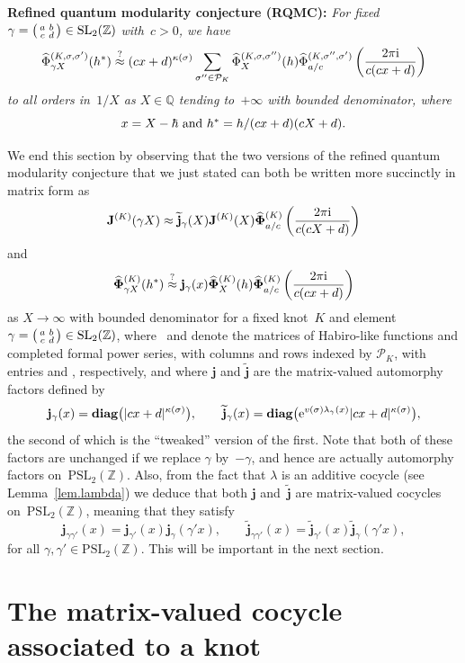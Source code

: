 \documentclass[pdftex]{sigma}
\numberwithin{equation}{section}
\def\BZ{\mathbb Z}
\def\calP{\mathcal P}
\def\calP{\mathcal P}
\def\l{\lambda}
\def\k{\kappa}
\def\wt{\widetilde}
\def\SL{\mathrm{SL}}
\def\PSL{\mathrm{PSL}}
\def\Phih{\widehat\Phi}
\def\l{\lambda}
\def\Z{\mathbb Z}
\def\Q{\mathbb Q}
\def\l{\lambda}
\def\s{\sigma}
\def\sma#1#2#3#4{\bigl(\smallmatrix#1&#2\\#3&#4\endsmallmatrix\bigr)} %
\def\J{\mathbf J} \def\J{J} %
\def\tV{v} %
\def\be{\begin{equation}}
\def\ee{\end{equation}}
\def\g{\gamma}
\def\diag{\operatorname{\mathbf{diag}}} %
\def\bJ{J} \def\bJ{\mathbf{J}}
\def\bPhih{\mathbf{\Phih}}
\def\jp{\mathbf{j}}
\def\jt{\jp_\l} %
\def\jt{\jp_{\text{tw}}} %
\def\jt{\jp_{\textsf T}} %
\def\jt{\jp^{(\l)}}
\def\jt{\jp^{(\l)}}
\def\jt{\wt{\jp}}
\begin{document}
{\bf Refined quantum modularity conjecture (RQMC):}
\emph{For fixed $\g=\sma abcd\in\SL_2(\Z)$ with~${c>0}$, we have
\[%
\Phih^{(K,\s,\s')}_{\g X}(h^*)  \overset?\approx
(cx+d)^{\k(\s)} \sum_{\s'' \in \calP_K}\Phih^{(K,\s,\s'')}_X(h)
\Phih^{(K,\s'',\s')}_{a/c}\left(\frac{2\pi {\rm i}}{c(cx+d)}\right)
\]
to all orders in~$1/X$ as $X\in\Q$ tending to~$+\infty$ with bounded denominator, where}
\[x=X-\hbar$ and~${h^*=h/(cx+d)(cX+d)}.\]

We end this section by observing that the two versions of the refined quantum modularity
conjecture that we just stated can both be written more succinctly in matrix form as
\be
\label{dQPhi}
\bJ^{(K)}(\g X)
 \approx \jt_\g(X) \bJ^{(K)}(X) \bPhih^{(K)}_{a/c}\left(\frac{2\pi {\rm i}}{c(cX+d)}\right)
\ee
and
\be
\label{MatQMC}
\bPhih^{(K)}_{\g X}(h^*)  \overset?\approx  \jp_\g(x)
\bPhih^{(K)}_X(h) \bPhih^{(K)}_{a/c}\left(\frac{2\pi {\rm i}}{c(cx+d)}\right)
\ee
as $X\to\infty$ with bounded denominator for a fixed knot~$K$ and element
$\g=\sma abcd\in\SL_2(\Z)$, where~\smash{$\bJ^{(K)}$} and \smash{$\bPhih^{(K)}$} denote the matrices
of Habiro-like functions and completed formal power series, with columns and rows
indexed by $\calP_K$, with entries \smash{$\J^{(K,\s,\s')}(x)$} and \smash{$\Phi^{(K,\s,\s')}_{a/c}(h)$},
respectively, and where $\jp$ and $\jt$ are the matrix-valued automorphy factors
defined by
\be
\label{autofactor}
\jp_\g(x) = \diag\bigl(|cx+d|^{\kappa(\s)}\bigr) ,\qquad
\jt_\g(x) = \diag\bigl({\rm e}^{\tV(\s) \l_\g(x)} |cx+d|^{\kappa(\s)}\bigr) ,
\ee
the second of which is the ``tweaked'' version of the first.
Note that both of these factors are unchanged if we replace $\g$ by~$-\g$, and
hence are actually automorphy factors on~$\PSL_2(\Z)$. Also, from the fact
that $\l$ is an additive cocycle (see Lemma~\ref{lem.lambda}) we deduce that both
$\jp$ and~$\jt$ are matrix-valued cocycles on~$\PSL_2(\Z)$, meaning that they satisfy
\be
\label{jcoc}
 \jp_{\g \g'}(x) = \jp_{\g'}(x)  \jp_\g(\g' x) , \qquad
\jt_{\g \g'}(x) = \jt_{\g'}(x)  \jt_\g(\g' x) ,
\ee
for all $\g, \g'\in \PSL_2(\BZ)$. This will be important in the next section.


\section{The matrix-valued cocycle associated to a knot}
\label{sec.Matrix}
\end{document}
